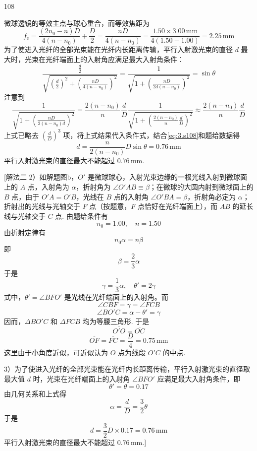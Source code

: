 \begin{solution}{108}
\begin{subsolution}
微球透镜的等效主点与球心重合，而等效焦距为
\begin{equation}
f_{\mathrm{e}} = \frac{(2n_{0} - n)D}{4(n - n_{0})} + \frac{D}{2} = \frac{n D}{4(n - n_{0})} = \frac{1.50 \times 3.00\,\mathrm{mm}}{4(1.50 - 1.00)} = 2.25\,\mathrm{mm}
\label{eq:9.s108}
\end{equation}
为了使进入光纤的全部光束能在光纤内长距离传输，平行入射激光束的直径 $d$ 最大时，光束在光纤端面上的入射角应满足最大入射角条件：
\[
\frac{\frac{d}{2}}{\sqrt{\left(\frac{d}{2}\right)^{2} + \left(\frac{n D}{4(n - n_{0})}\right)^{2}}} = \frac{1}{\sqrt{1 + \left(\frac{n D}{2 d (n - n_{0})}\right)^{2}}} = \sin\theta
\]
注意到
\[
\frac{1}{\sqrt{1 + \left(\frac{n D}{2 (n - n_{0}) d}\right)^{2}}} = \frac{2(n - n_{0})}{n}\frac{d}{D}\frac{1}{\sqrt{1 + \left(\frac{2(n - n_{0})}{n}\frac{d}{D}\right)^{2}}} \approx \frac{2(n - n_{0})}{n}\frac{d}{D}
\]
上式已略去 $\left(\frac{d}{D}\right)^{3}$ 项，将上式结果代入条件式，结合\eqref{eq:3.s108}和题给数据得
\begin{equation}
d = \frac{n}{2(n - n_{0})} D \sin\theta = 0.76\,\mathrm{mm}
\label{eq:10.s108}
\end{equation}
平行入射激光束的直径最大不能超过 $0.76\,\mathrm{mm}$.

[解法二
2）如解题图b，$O'$ 是微球球心，入射光束边缘的一根光线入射到微球面上的 $A$ 点，入射角为 $\alpha$，折射角为 $\angle O'AB \equiv \beta$；在微球的大圆内射到微球面上的 $B$ 点，由于 $O'A = O'B$，光线在 $B$ 点的入射角 $\angle O'BA = \beta$，折射角必定为 $\alpha$；折射出的光线与光轴交于 $F$ 点（按题意，$F$ 点恰好在光纤端面上），而 $AB$ 的延长线与光轴交于 $C$ 点.
由题给条件有
\[
n_{0} = 1.00,\quad n = 1.50
\]
由折射定律有
\[
n_{0}\alpha = n\beta
\]
即
\[
\beta = \frac{2}{3}\alpha
\]
于是
\[
\gamma = \frac{1}{3}\alpha,\quad \theta' = 2\gamma
\]
式中，$\theta' = \angle BFO'$ 是光线在光纤端面上的入射角。而
\[
\angle CBF = \gamma = \angle FCB
\]
\[
\angle BO'C = \alpha - \theta' = \gamma
\]
因而，$\Delta BO'C$ 和 $\Delta FCB$ 均为等腰三角形. 于是
\[
\overline{O'O} = \overline{OC}
\]
\[
\overline{OF} = \overline{FC} = \frac{D}{4} = 0.75\,\mathrm{mm}
\]
这里由于小角度近似，可近似认为 $O$ 点为线段 $O'C$ 的中点.

3）为了使进入光纤的全部光束能在光纤内长距离传输，平行入射激光束的直径取最大值 $d$ 时，光束在光纤端面上的入射角 $\angle BFO'$ 应满足最大入射角条件，即
\[
\theta' = \theta = 0.17
\]
由几何关系和上式得
\[
\alpha = \frac{d}{D} = \frac{3}{2}\theta
\]
于是
\[
d = \frac{3}{2} D \times 0.17 = 0.76\,\mathrm{mm}
\]
平行入射激光束的直径最大不能超过 $0.76\,\mathrm{mm}$.]


\end{subsolution}
\end{solution}
